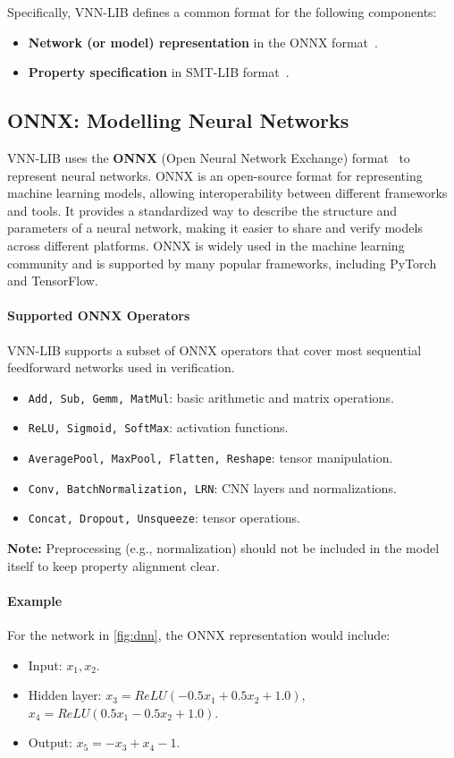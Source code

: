 \documentclass[oneside,11pt,dvipsnames]{book}
\begin{document}
Specifically, VNN-LIB defines a common format for the following components:
\begin{itemize}
    \item \textbf{Network (or model) representation} in the ONNX format~\cite{onnx}.
    \item \textbf{Property specification} in SMT-LIB format~\cite{barrett2010smt}.
\end{itemize}

\subsection{ONNX: Modelling Neural Networks}

VNN-LIB uses the \textbf{ONNX} (Open Neural Network Exchange) format~\cite{onnx} to represent neural networks. ONNX is an open-source format for representing machine learning models, allowing interoperability between different frameworks and tools. It provides a standardized way to describe the structure and parameters of a neural network, making it easier to share and verify models across different platforms.
ONNX is widely used in the machine learning community and is supported by many popular frameworks, including PyTorch and TensorFlow.


\paragraph{Supported ONNX Operators} VNN-LIB supports a subset of ONNX operators that cover most sequential feedforward networks used in verification.

\begin{itemize}
    \item \texttt{Add, Sub, Gemm, MatMul}: basic arithmetic and matrix operations.
    \item \texttt{ReLU, Sigmoid, SoftMax}: activation functions.
    \item \texttt{AveragePool, MaxPool, Flatten, Reshape}: tensor manipulation.
    \item \texttt{Conv, BatchNormalization, LRN}: CNN layers and normalizations.
    \item \texttt{Concat, Dropout, Unsqueeze}: tensor operations.
\end{itemize}

\textbf{Note:} Preprocessing (e.g., normalization) should not be included in the model itself to keep property alignment clear.

\paragraph{Example} For the network in \autoref{fig:dnn}, the ONNX representation would include:
\begin{itemize}
    \item Input: $x_1, x_2$.
    \item Hidden layer: $x_3 = ReLU(-0.5x_1 + 0.5x_2 + 1.0)$, $x_4 = ReLU(0.5x_1 - 0.5x_2 + 1.0)$.
    \item Output: $x_5 = -x_3 + x_4 - 1$.
\end{itemize}
\end{document}
